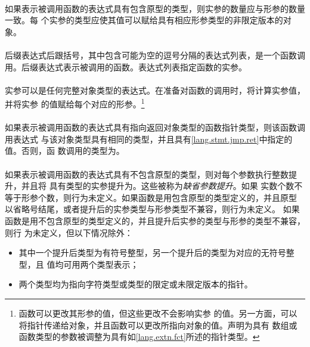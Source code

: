 \paragraph{}
如果表示被调用函数的表达式具有包含原型的类型，则实参的数量应与形参的数量一致。每
个实参的类型应使其值可以赋给具有相应形参类型的非限定版本的对象。

\semantic
\paragraph{}
后缀表达式后跟括号\tm{()}，其中包含可能为空的逗号分隔的表达式列表，是一个函数调
用。后缀表达式表示被调用的函数。表达式列表指定函数的实参。

\paragraph{}
实参可以是任何完整对象类型的表达式。在准备对函数的调用时，将计算实参值，并将实参
的值赋给每个对应的形参。\footnote{函数可以更改其形参的值，但这些更改不会影响实参
的值。另一方面，可以将指针传递给对象，并且函数可以更改所指向对象的值。声明为具有
数组或函数类型的参数被调整为具有如\ref{lang.extn.fct}所述的指针类型。}

\paragraph{}
如果表示被调用函数的表达式具有指向返回对象类型的函数指针类型，则该函数调用表达式
与该对象类型具有相同的类型，并且具有\ref{lang.stmt.jmp.ret}中指定的值。否则，函
数调用的类型为。

\paragraph{}
如果表示被调用函数的表达式具有不包含原型的类型，则对每个参数执行整数提升，并且将
具有类型的实参提升为。这些被称为\textit{缺省参数提升}。如果
实数个数不等于形参个数，则行为未定义。如果函数是用包含原型的类型定义的，并且原型
以省略号\tm{(, \ldots)}结尾，或者提升后的实参类型与形参类型不兼容，则行为未定义。
如果函数是用不包含原型的类型定义的，并且提升后实参的类型与形参的类型不兼容，则行
为未定义，但以下情况除外：
\begin{itemize}
  \item{其中一个提升后类型为有符号整型，另一个提升后的类型为对应的无符号整型，且
    值均可用两个类型表示；}
  \item{两个类型均为指向字符类型或类型的限定或未限定版本的指针。}
\end{itemize}

